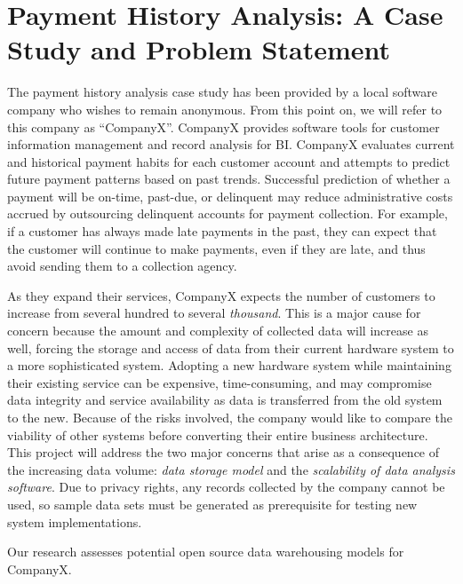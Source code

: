 %
%
\chapter{Payment History Analysis: A Case Study and Problem Statement} \label{ch:problem}
The payment history analysis case study has been provided by a local software company who wishes to remain anonymous. From this point on, we will 
refer to this company as ``CompanyX''.  CompanyX provides software tools for customer information management and record analysis for BI. CompanyX evaluates current and historical payment habits for each customer account and attempts to predict future payment patterns based on past trends. Successful prediction of whether a payment will be on-time, past-due, or delinquent may reduce administrative costs accrued by outsourcing delinquent accounts for payment collection.  For example, if a customer has always made late payments in the past, they can expect that the customer will continue to make payments, even if they are late, and thus avoid sending them to a collection agency. 

As they expand their services, CompanyX expects the number of customers to increase from several hundred to several \textit{thousand}. This is a major cause for concern because the amount and complexity of collected data will increase as well, forcing the storage and access of data from their current hardware system to a more sophisticated system. Adopting a new hardware system while maintaining their existing service can be expensive, time-consuming, and may compromise data integrity and service availability as data is transferred from the old system to the new. Because of the risks involved, the company would like to compare the viability of other systems before converting their entire business architecture. This project will address the two major concerns that arise as a consequence of the increasing data volume: \textit{data storage model} and the \textit{scalability of data analysis software}. Due to privacy rights, any records collected by the company cannot be used, so sample data sets must be generated as prerequisite for testing new system implementations.

Our research assesses potential open source data warehousing models for CompanyX.

